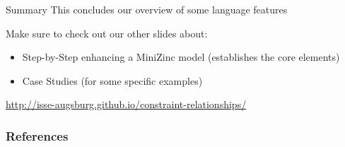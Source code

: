 \documentclass[10pt,xcolor={dvipsnames},fleqn]{beamer}
\begin{document}
\begin{frame}{Summary}
This concludes our overview of some language features


\vspace*{2ex}

Make sure to check out our other slides about:
\begin{itemize}
\item Step-by-Step enhancing a MiniZinc model (establishes the core elements)
\item Case Studies (for some specific examples)
\end{itemize}

\vspace*{2ex}

\url{http://isse-augsburg.github.io/constraint-relationships/}
\end{frame}

\begin{frame}[allowframebreaks]
        \frametitle{References}
        
        
\end{frame}
\end{document}
